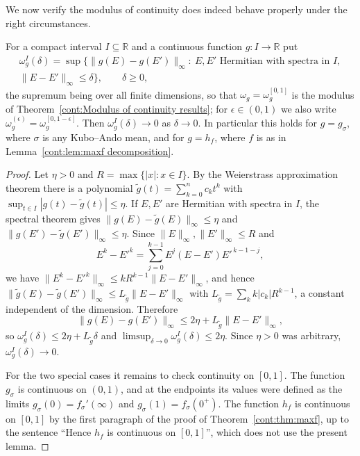 We now verify the modulus of continuity does indeed behave properly under the right circumstances.
\begin{lemma}\label{cont:modulus to zero}
For a compact interval $I\subseteq\mathbb{R}$ and a continuous function $g:I\to\mathbb{R}$ put
\begin{multline*}%
\omega^I_g(\delta)=\sup\big\{\|g(E)-g(E')\|_\infty:\ E,E'\text{ Hermitian with spectra in }I,\\ \|E-E'\|_\infty\leq\delta\big\},\qquad\delta\geq0,
\end{multline*}
the supremum being over all finite dimensions, so that $\omega_g=\omega^{[0,1]}_g$ is the modulus of Theorem~\ref{cont:Modulus of continuity results}; for $\epsilon\in(0,1)$ we also write $\omega^{(\epsilon)}_g=\omega^{[0,1-\epsilon]}_g$. Then $\omega^I_g(\delta)\to0$ as $\delta\to0$.
In particular this holds for $g=g_\sigma$, where $\sigma$ is any Kubo--Ando mean, and for $g=h_f$, where $f$ is as in
Lemma~\ref{cont:lem:maxf decomposition}.
\end{lemma}
\begin{proof}
Let $\eta>0$ and $R=\max\{|x|:x\in I\}$. By the Weierstrass approximation theorem there is a polynomial $\tilde g(t)=\sum_{k=0}^nc_kt^k$ with
$\sup_{t\in I}|g(t)-\tilde g(t)|\leq\eta$. If $E,E'$ are Hermitian with spectra in $I$, the spectral theorem gives $\|g(E)-\tilde g(E)\|_\infty\leq\eta$ and
$\|g(E')-\tilde g(E')\|_\infty\leq\eta$. Since $\|E\|_\infty,\|E'\|_\infty\leq R$ and
\[
E^k-E'^k=\sum_{j=0}^{k-1}E^j(E-E')E'^{\,k-1-j},
\]
we have $\|E^k-E'^k\|_\infty\leq kR^{k-1}\|E-E'\|_\infty$, and hence
$\|\tilde g(E)-\tilde g(E')\|_\infty\leq L_{\tilde g}\|E-E'\|_\infty$ with $L_{\tilde g}=\sum_{k}k|c_k|R^{k-1}$, a constant independent of the dimension.
Therefore
\[
\|g(E)-g(E')\|_\infty\leq2\eta+L_{\tilde g}\|E-E'\|_\infty,
\]
so $\omega^I_g(\delta)\leq2\eta+L_{\tilde g}\delta$ and $\limsup_{\delta\to0}\omega^I_g(\delta)\leq2\eta$. Since $\eta>0$
was arbitrary, $\omega^I_g(\delta)\to0$.
 
For the two special cases it remains to check continuity on $[0,1]$. The function $g_\sigma$ is continuous on $(0,1)$,
and at the endpoints its values were defined as the limits $g_\sigma(0)=f_\sigma'(\infty)$ and
$g_\sigma(1)=f_\sigma(0^+)$. The function $h_f$ is continuous on $[0,1]$ by the first paragraph of the proof of Theorem~\ref{cont:thm:maxf}, up to the sentence ``Hence $h_f$ is continuous on $[0,1]$'', which does not use the present lemma.
\end{proof}
 
